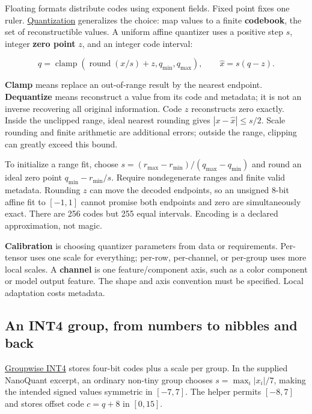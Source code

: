 Floating formats distribute codes using exponent fields. Fixed point fixes one ruler. \hyperref[appendix-d5da3eaabaef]{Quantization} generalizes the choice: map values to a finite \textbf{codebook}, the set of reconstructible values. A uniform affine quantizer uses a positive step \(s\), integer \textbf{zero point} \(z\), and an integer code interval:

\[
q=\operatorname{clamp}\!\left(\operatorname{round}(x/s)+z,q_{\min},q_{\max}\right),
\qquad
\widehat x=s(q-z).
\]

\textbf{Clamp} means replace an out-of-range result by the nearest endpoint. \textbf{Dequantize} means reconstruct a value from its code and metadata; it is not an inverse recovering all original information. Code \(z\) reconstructs zero exactly. Inside the unclipped range, ideal nearest rounding gives \(|x-\widehat x|\le s/2\). Scale rounding and finite arithmetic are additional errors; outside the range, clipping can greatly exceed this bound.

To initialize a range fit, choose \(s=(r_{\max}-r_{\min})/(q_{\max}-q_{\min})\) and round an ideal zero point \(q_{\min}-r_{\min}/s\). Require nondegenerate ranges and finite valid metadata. Rounding \(z\) can move the decoded endpoints, so an unsigned 8-bit affine fit to \([-1,1]\) cannot promise both endpoints and zero are simultaneously exact. There are 256 codes but 255 equal intervals. Encoding is a declared approximation, not magic.

\textbf{Calibration} is choosing quantizer parameters from data or requirements. Per-tensor uses one scale for everything; per-row, per-channel, or per-group uses more local scales. A \textbf{channel} is one feature/component axis, such as a color component or model output feature. The shape and axis convention must be specified. Local adaptation costs metadata.

\subsection{An INT4 group, from numbers to nibbles and back}\label{01-foundations-i-ch001-an-int4-group-from-numbers-to-nibbles-and-back}

\hyperref[appendix-638204c40e8b]{Groupwise INT4} stores four-bit codes plus a scale per group. In the supplied NanoQuant excerpt, an ordinary non-tiny group chooses \(s=\max_i|x_i|/7\), making the intended signed values symmetric in \([-7,7]\). The helper permits \([-8,7]\) and stores offset code \(c=q+8\) in \([0,15]\).

